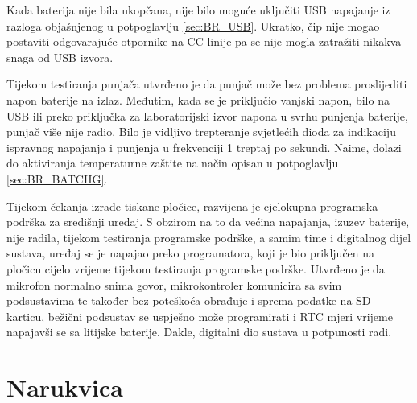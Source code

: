 Kada baterija nije bila ukopčana, nije bilo moguće uključiti USB napajanje iz razloga objašnjenog u potpoglavlju \ref{sec:BR_USB}. Ukratko, čip nije mogao postaviti odgovarajuće otpornike na CC linije pa se nije mogla zatražiti nikakva snaga od USB izvora.

Tijekom testiranja punjača utvrđeno je da punjač može bez problema proslijediti napon baterije na izlaz. Međutim, kada se je priključio vanjski napon, bilo na USB ili preko priključka za laboratorijski izvor napona u svrhu punjenja baterije, punjač više nije radio. Bilo je vidljivo trepteranje svjetlećih dioda za indikaciju ispravnog napajanja i punjenja u frekvenciji 1 treptaj po sekundi. Naime, dolazi do aktiviranja temperaturne zaštite na način opisan u potpoglavlju \ref{sec:BR_BATCHG}.

Tijekom čekanja izrade tiskane pločice, razvijena je cjelokupna programska podrška za središnji uređaj. S obzirom na to da većina napajanja, izuzev baterije, nije radila, tijekom testiranja programske podrške, a samim time i digitalnog dijel sustava, uređaj se je napajao preko programatora, koji je bio priključen na pločicu cijelo vrijeme tijekom testiranja programske podrške. Utvrđeno je da mikrofon normalno snima govor, mikrokontroler komunicira sa svim podsustavima te također bez poteškoća obrađuje i sprema podatke na SD karticu, bežični podsustav se uspješno može programirati i RTC mjeri vrijeme napajavši se sa litijske baterije. Dakle, digitalni dio sustava u potpunosti radi.

\section{Narukvica}

